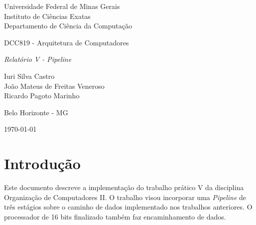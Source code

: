 \documentclass[11pt,a4paper,titlepage]{article}
\newcommand{\titulo}{\textit{Relatório V - Pipeline}}
\begin{document}
\begin{titlepage}
\begin{center}

\begin{large}
Universidade Federal de Minas Gerais\\
Instituto de Ciências Exatas\\
Departamento de Ciência da Computação\\
\end{large}

\vspace{20mm}

\begin{Large}
DCC819 - Arquitetura de Computadores
\end{Large}

\vspace{20mm}

\begin{LARGE}
\titulo
\end{LARGE}


\vspace{30mm}

\begin{Large}
\begin{center}
Iuri Silva Castro\\ João Mateus de Freitas Veneroso\\ Ricardo Pagoto Marinho \\
\end{center}
\end{Large}


\vspace{60mm}

{\sc Belo Horizonte - MG}

{\sc \today}

\end{center}
\end{titlepage}

\section{Introdução}\label{sec:desc}

Este documento descreve a implementação do trabalho prático V da disciplina
Organização de Computadores II. O trabalho visou incorporar uma \textit{Pipeline}
de três estágios sobre o caminho de dados implementado nos trabalhos anteriores.
O processador de 16 bits finalizado também faz encaminhamento de dados.
\end{document}
